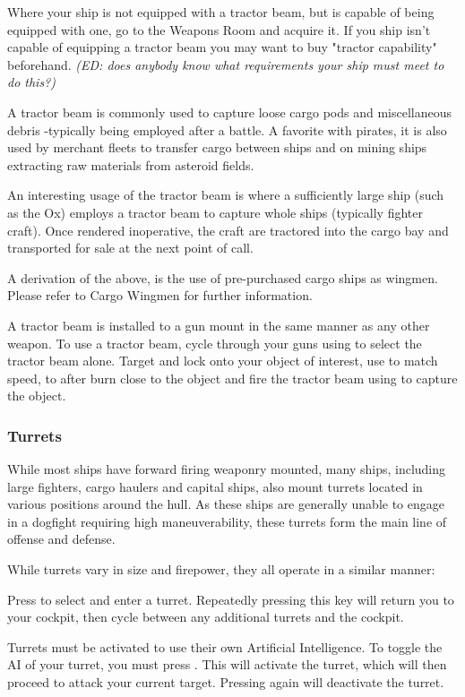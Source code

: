 \documentclass{article}
\newcommand{\key}[1]{%
  \tikz[baseline=(key.base)]{
    \node[draw=gray!50, fill=gray!5, rounded corners=2pt, inner sep=2pt, minimum height=1.5ex] (key) {\footnotesize\sffamily\bfseries #1};
  }%
}
\begin{document}
Where your ship is not equipped with a tractor beam, but is capable of being equipped with one, go to the Weapons Room and acquire it. If you ship isn't capable of equipping a tractor beam you may want to buy "tractor capability" beforehand. \textit{(ED: does anybody know what requirements your ship must meet to do this?) }


A tractor beam is commonly used to capture loose cargo pods and miscellaneous debris -typically being employed after a battle. A favorite with pirates, it is also used by merchant fleets to transfer cargo between ships and on mining ships extracting raw materials from asteroid fields. 


An interesting usage of the tractor beam is where a sufficiently large ship (such as the Ox) employs a tractor beam to capture whole ships (typically fighter craft). Once rendered inoperative, the craft are tractored into the cargo bay and transported for sale at the next point of call. 


A derivation of the above, is the use of pre-purchased cargo ships as wingmen. Please refer to Cargo Wingmen for further information. 

A tractor beam is installed to a gun mount in the same manner as any other weapon. To use a tractor beam, cycle through your guns using \key{g} to select the tractor beam alone. Target and lock onto your object of interest, use \key{HOME} to match speed, \key{TAB} to after burn close to the object and fire the tractor beam using \key{SPACE BAR} to capture the object. 

\subsubsection{ Turrets }

While most ships have forward firing weaponry mounted, many ships, including large fighters, cargo haulers and capital ships, also mount turrets located in various positions around the hull. As these ships are generally unable to engage in a dogfight requiring high maneuverability, these turrets form the main line of offense and defense. 


While turrets vary in size and firepower, they all operate in a similar manner: 


Press \key{]} to select and enter a turret. Repeatedly pressing this key will return you to your cockpit, then cycle between any additional turrets and the cockpit. 


Turrets must be activated to use their own Artificial Intelligence. To toggle the AI of your turret, you must press \key{o}. This will activate the turret, which will then proceed to attack your current target. Pressing \key{o} again will deactivate the turret. 
\end{document}
